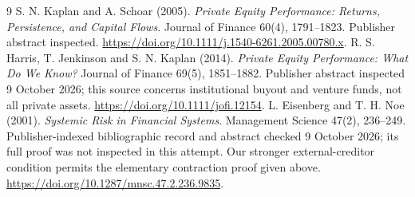 \documentclass[11pt]{article}
\theoremstyle{remark}
\begin{document}
\begin{thebibliography}{9}
 S. N. Kaplan and A. Schoar (2005).
\emph{Private Equity Performance: Returns, Persistence, and Capital Flows}.
Journal of Finance 60(4), 1791--1823. Publisher abstract inspected.
\url{https://doi.org/10.1111/j.1540-6261.2005.00780.x}.
 R. S. Harris, T. Jenkinson and S. N. Kaplan (2014).
\emph{Private Equity Performance: What Do We Know?} Journal of Finance
69(5), 1851--1882. Publisher abstract inspected 9 October 2026; this source
concerns institutional buyout and venture funds, not all private assets.
\url{https://doi.org/10.1111/jofi.12154}.
 L. Eisenberg and T. H. Noe (2001).
\emph{Systemic Risk in Financial Systems}. Management Science 47(2),
236--249. Publisher-indexed bibliographic record and abstract checked
9 October 2026; its full proof was not inspected in this attempt.
Our stronger external-creditor condition permits the elementary
contraction proof given above.
\url{https://doi.org/10.1287/mnsc.47.2.236.9835}.
\end{thebibliography}
\end{document}
